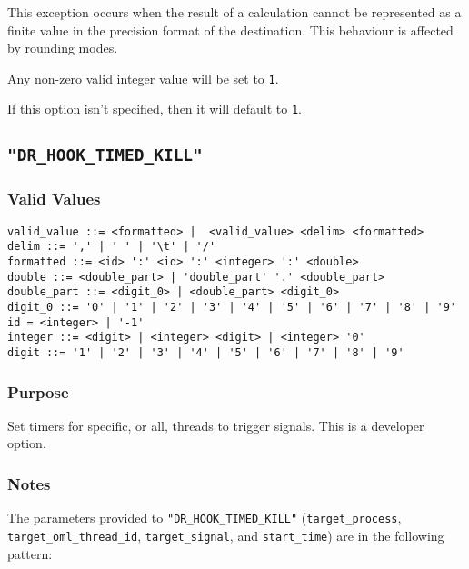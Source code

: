 This exception occurs when the result of a calculation cannot be represented as a finite value in the precision format of the destination. This behaviour is affected by rounding modes.

Any non-zero valid integer value will be set to \verb|1|.

If this option isn't specified, then it will default to \verb|1|.



\subsection{\texttt{"DR\_HOOK\_TIMED\_KILL"}}
\label{section:flags:DR_HOOK_TIMED_KILL}
\vspace{-2ex}
\subsubsection{Valid Values}
\vspace{-2ex}
\verb+valid_value ::= <formatted> |  <valid_value> <delim> <formatted>+ \\
\verb+delim ::= ',' | ' ' | '\t' | '/'+ \\
\verb+formatted ::= <id> ':' <id> ':' <integer> ':' <double>+\\
\verb+double ::= <double_part> | 'double_part' '.' <double_part>+ \\
\verb+double_part ::= <digit_0> | <double_part> <digit_0>+ \\
\verb+digit_0 ::= '0' | '1' | '2' | '3' | '4' | '5' | '6' | '7' | '8' | '9'+\\
\verb+id = <integer> | '-1'+\\
\verb+integer ::= <digit> | <integer> <digit> | <integer> '0'+ \\
\verb+digit ::= '1' | '2' | '3' | '4' | '5' | '6' | '7' | '8' | '9'+

\vspace{-2ex}
\subsubsection{Purpose}
\vspace{-2ex}
Set timers for specific, or all, threads to trigger signals. This is a developer option.

\vspace{-2ex}
\subsubsection{Notes}
\vspace{-2ex}
The parameters provided to \texttt{"DR\_HOOK\_TIMED\_KILL"} (\verb|target_process|,\\ \verb|target_oml_thread_id|, \verb|target_signal|, and \verb|start_time|) are in the following pattern:

